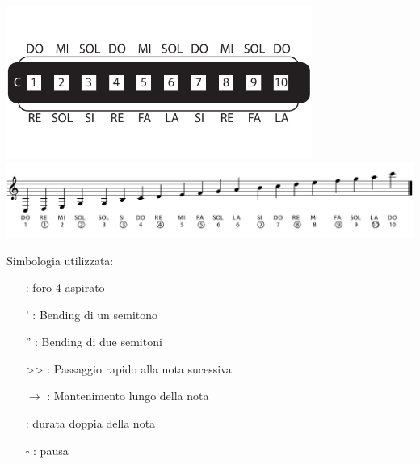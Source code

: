 \begin{center}
	\includegraphics[width=10cm]{chapters/Note-Armonica.pdf}
	\includegraphics[width=\textwidth]{chapters/SPARTITO ARMONICA.pdf}
\end{center}

Simbologia utilizzata:
\begin{enumerate}
\item[\asp{4}] : foro 4 aspirato
\item['] : Bending di un semitono
\item[''] : Bending di due semitoni
\item[>>] : Passaggio rapido alla nota sucessiva
\item[$\rightarrow$] : Mantenimento lungo della nota
\item[\underline{\asp{4}}] : durata doppia della nota
\item[$\square$] : pausa
\end{enumerate}